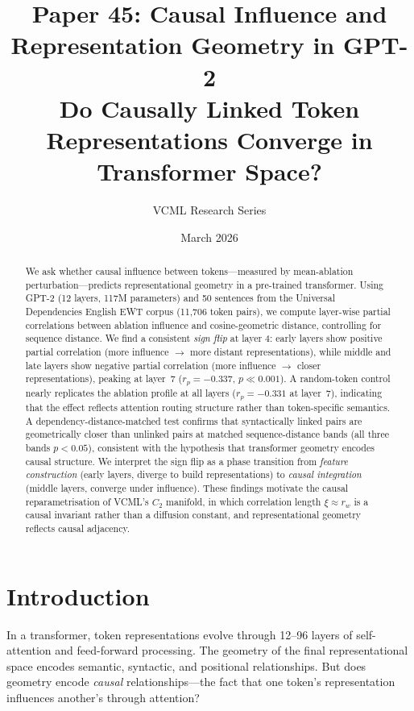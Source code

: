 \documentclass[11pt,a4paper]{article}
\title{\textbf{Paper 45: Causal Influence and Representation Geometry in GPT-2}\\
\large Do Causally Linked Token Representations Converge in Transformer Space?}
\author{VCML Research Series}
\date{March 2026}
\begin{document}
\maketitle

\begin{abstract}
We ask whether causal influence between tokens---measured by mean-ablation
perturbation---predicts representational geometry in a pre-trained transformer.
Using GPT-2 (12 layers, 117M parameters) and 50 sentences from the Universal
Dependencies English EWT corpus (11{,}706 token pairs), we compute layer-wise
partial correlations between ablation influence and cosine-geometric distance,
controlling for sequence distance.
We find a consistent \emph{sign flip} at layer 4: early layers show positive
partial correlation (more influence $\to$ more distant representations),
while middle and late layers show negative partial correlation
(more influence $\to$ closer representations), peaking at layer~7
($r_p = -0.337$, $p \ll 0.001$).
A random-token control nearly replicates the ablation profile at all layers
($r_p = -0.331$ at layer~7), indicating that the effect reflects
attention routing structure rather than token-specific semantics.
A dependency-distance-matched test confirms that syntactically linked pairs
are geometrically closer than unlinked pairs at matched sequence-distance
bands (all three bands $p < 0.05$), consistent with the hypothesis that
transformer geometry encodes causal structure.
We interpret the sign flip as a phase transition from \emph{feature construction}
(early layers, diverge to build representations) to \emph{causal integration}
(middle layers, converge under influence).
These findings motivate the causal reparametrisation of VCML's $C_2$ manifold,
in which correlation length $\xi \approx r_w$ is a causal invariant rather than
a diffusion constant, and representational geometry reflects causal adjacency.
\end{abstract}

\section{Introduction}

In a transformer, token representations evolve through 12--96 layers of
self-attention and feed-forward processing.
The geometry of the final representational space encodes semantic, syntactic,
and positional relationships.
But does geometry encode \emph{causal} relationships---the fact that one
token's representation influences another's through attention?
\end{document}
